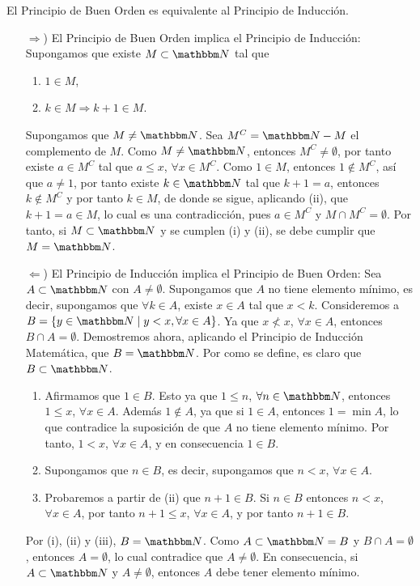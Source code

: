 \begin{theorem}
    El Principio de Buen Orden es equivalente al Principio de Inducción. \\
    \demostracion
    \begin{enumerate}
        \item[$\Rightarrow$)] El Principio de Buen Orden implica el Principio de Inducción: Supongamos que existe $M \subset \NN$ tal que
        \begin{enumerate}[label=\roman*)]
            \item $1 \in M$,
            \item $k \in M \Longrightarrow k + 1 \in M$.
        \end{enumerate}
        Supongamos que $M \neq \NN$. Sea $M^C = \NN - M$ el complemento de $M$. Como $M \neq \NN$, entonces $M^C \neq \emptyset$, por tanto existe $a \in M^C$ tal que $a \leq x$, $\forall x \in M^C$. Como $1 \in M$, entonces $1 \notin M^C$, así que $a \neq 1$, por tanto existe $k \in \NN$ tal que $k + 1 = a$, entonces $k \notin M^C$ y por tanto $k \in M$, de donde se sigue, aplicando (ii), que $k + 1 = a \in M$, lo cual es una contradicción, pues $a \in M^C$ y $M \cap M^C = \emptyset$. Por tanto, si $M \subset \NN$ y se cumplen (i) y (ii), se debe cumplir que $M = \NN$.
        \item[$\Leftarrow$)] El Principio de Inducción implica el Principio de Buen Orden: Sea $A \subset \NN$ con $A \neq \emptyset$. Supongamos que $A$ no tiene elemento mínimo, es decir, supongamos que $\forall k \in A$, existe $x \in A$ tal que $x < k$. Consideremos a $B = \{ y \in \NN \mid y < x, \forall x \in A \}$. Ya que $x \nless x$, $\forall x \in A$, entonces $B \cap A = \emptyset$. Demostremos ahora, aplicando el Principio de Inducción Matemática, que $B = \NN$. Por como se define, es claro que $B \subset \NN$.\newpage
        \begin{enumerate}[label=\roman*)]
            \item Afirmamos que $1 \in B$. Esto ya que $1 \leq n$, $\forall n \in \NN$, entonces $1 \leq x$, $\forall x \in A$. Además $1 \notin A$, ya que si $1 \in A$, entonces $1 = \min A$, lo que contradice la suposición de que $A$ no tiene elemento mínimo. Por tanto, $1 < x$, $\forall x \in A$, y en consecuencia $1 \in B$.
            \item Supongamos que $n \in B$, es decir, supongamos que $n < x$, $\forall x \in A$.
            \item Probaremos a partir de (ii) que $n + 1 \in B$. Si $n \in B$ entonces $n < x$, $\forall x \in A$, por tanto $n + 1 \leq x$, $\forall x \in A$, y por tanto $n + 1 \in B$.
        \end{enumerate}
        Por (i), (ii) y (iii), $B = \NN$. Como $A \subset \NN = B$ y $B \cap A = \emptyset$, entonces $A = \emptyset$, lo cual contradice que $A \neq \emptyset$. En consecuencia, si $A \subset \NN$ y $A \neq \emptyset$, entonces $A$ debe tener elemento mínimo.
    \end{enumerate}
\end{theorem}

